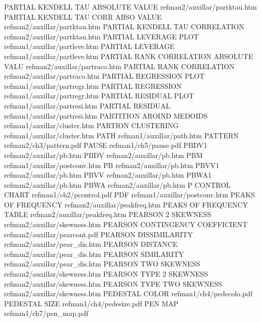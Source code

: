 PARTIAL KENDELL TAU ABSOLUTE VALUE      refman2/auxillar/partktau.htm
PARTIAL KENDELL TAU CORR ABSO VALUE     refman2/auxillar/partktau.htm
PARTIAL KENDELL TAU CORRELATION         refman2/auxillar/partktau.htm
PARTIAL LEVERAGE PLOT                   refman1/auxillar/partleve.htm
PARTIAL LEVERAGE                        refman1/auxillar/partleve.htm
PARTIAL RANK CORRELATION ABSOLUTE VALU  refman2/auxillar/partraco.htm
PARTIAL RANK CORRELATION                refman2/auxillar/partraco.htm
PARTIAL REGRESSION PLOT                 refman1/auxillar/partregr.htm
PARTIAL REGRESSION                      refman1/auxillar/partregr.htm
PARTIAL RESIDUAL PLOT                   refman1/auxillar/partresi.htm
PARTIAL RESIDUAL                        refman1/auxillar/partresi.htm
PARTITION AROIND MEDOIDS                refman1/auxillar/cluster.htm
PARTION CLUSTERING                      refman1/auxillar/cluster.htm
PATH                                    refman1/auxillar/path.htm
PATTERN                                 refman2/ch3/pattern.pdf
PAUSE                                   refman1/ch5/pause.pdf
PBDV1                                   refman2/auxillar/pb.htm
PBDV                                    refman2/auxillar/pb.htm
PBM                                     refman1/auxillar/postconv.htm
PB                                      refman2/auxillar/pb.htm
PBVV1                                   refman2/auxillar/pb.htm
PBVV                                    refman2/auxillar/pb.htm
PBWA1                                   refman2/auxillar/pb.htm
PBWA                                    refman2/auxillar/pb.htm
P CONTROL CHART                         refman1/ch2/pcontrol.pdf
PDF                                     refman1/auxillar/postconv.htm
PEAKS OF FREQUENCY                      refman2/auxillar/peakfreq.htm
PEAKS OF FREQUENCY TABLE                refman2/auxillar/peakfreq.htm
PEARSON 2 SKEWNESS                      refman2/auxillar/skewness.htm
PEARSON CONTINGENCY COEFFICIENT         refman2/auxillar/pearcont.pdf
PEARSON DISSIMILARITY                   refman2/auxillar/pear_dis.htm
PEARSON DISTANCE                        refman2/auxillar/pear_dis.htm
PEARSON SIMILARITY                      refman2/auxillar/pear_dis.htm
PEARSON TWO SKEWNESS                    refman2/auxillar/skewness.htm
PEARSON TYPE 2 SKEWNESS                 refman2/auxillar/skewness.htm
PEARSON TYPE TWO SKEWNESS               refman2/auxillar/skewness.htm
PEDESTAL COLOR                          refman1/ch4/pedecolo.pdf
PEDESTAL SIZE                           refman1/ch4/pedesize.pdf
PEN MAP                                 refman1/ch7/pen_map.pdf
